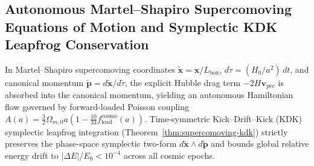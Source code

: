 \documentclass[11pt,letterpaper]{article}
\theoremstyle{plain}
\begin{document}
\subsection{Autonomous Martel--Shapiro Supercomoving Equations of Motion and Symplectic KDK Leapfrog Conservation}
In Martel--Shapiro supercomoving coordinates $\tilde{\mathbf{x}} = \mathbf{x}/L_{\mathrm{box}}$, $d\tilde{\tau} = (H_0/a^2)\,dt$, and canonical momentum $\tilde{\mathbf{p}} = d\tilde{\mathbf{x}}/d\tilde{\tau}$, the explicit Hubble drag term $-2H\mathbf{v}_{\mathrm{pec}}$ is absorbed into the canonical momentum, yielding an autonomous Hamiltonian flow governed by forward-loaded Poisson coupling $A(a) = \frac{3}{2}\Omega_{m,0}a(1 - \frac{10}{33}f_{\mathrm{load}}^{\mathrm{cosmo}}(a))$. Time-symmetric Kick--Drift--Kick (KDK) symplectic leapfrog integration (Theorem~\ref{thm:supercomoving-kdk}) strictly preserves the phase-space symplectic two-form $d\tilde{\mathbf{x}}\wedge d\tilde{\mathbf{p}}$ and bounds global relative energy drift to $|\Delta E|/E_0 < 10^{-4}$ across all cosmic epochs.
\end{document}
